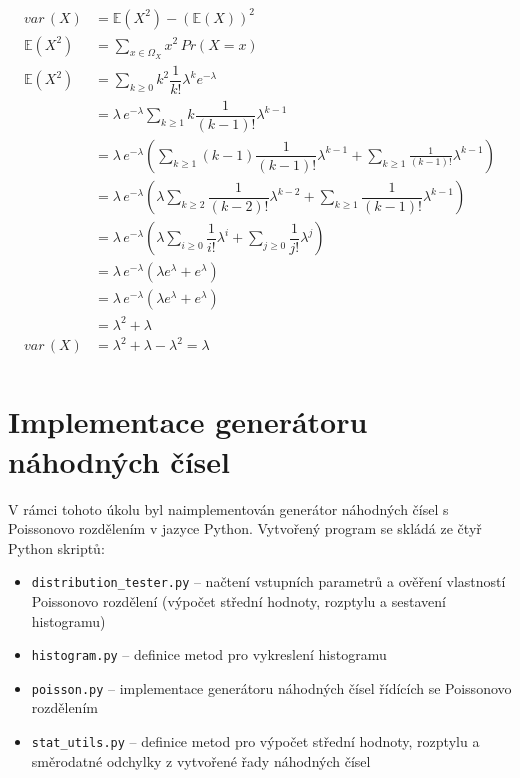 \documentclass[12pt, a4paper]{article}
\let\oldsection\section
\renewcommand\section{\clearpage\oldsection}
\begin{document}
    \begin{equation}
        \label{variance}
        \begin{split}
            var\,(X) & = \mathbb{E} (X^2) - (\mathbb{E} (X))^2 \\
            \mathbb{E} (X^2) &= \sum_{x \mathop \in \Omega_{X}} x^2 \, Pr(X = x) \\
            \mathbb{E} (X^2) &= \sum_{k \mathop \ge 0} {k^2 \dfrac 1 {k!} \lambda^k e^{-\lambda} } \\
            & = \lambda\, e^{-\lambda} \sum_{k \mathop \ge 1} {k \dfrac 1 {(k - 1)!} \lambda^{k - 1} } \\
            & = \lambda\, e^{-\lambda} ( \sum_{k \mathop \ge 1} {(k - 1) \dfrac 1 {(k - 1)!} \lambda^{k - 1} } + \sum_{k \mathop \ge 1} {\frac 1 {(k - 1)!} \lambda^{k - 1} }  ) \\
            & = \lambda\, e^{-\lambda} ( \lambda \sum_{k \mathop \ge 2} {\dfrac 1 {(k - 2)!} \lambda^{k - 2} } + \sum_{k \mathop \ge 1} {\dfrac 1 {(k - 1)!} \lambda^{k - 1} } ) \\
            & = \lambda\, e^{-\lambda} ( \lambda \sum_{i \mathop \ge 0} {\dfrac 1 {i!} \lambda^i} + \sum_{j \mathop \ge 0} {\dfrac 1 {j!} \lambda^j} ) \\
            & = \lambda\, e^{-\lambda} ( \lambda e^\lambda + e^\lambda) \\
            & = \lambda\, e^{-\lambda} ( \lambda e^\lambda + e^\lambda) \\
            & = \lambda^2 + \lambda \\
            var\,(X) & = \lambda^{2} + \lambda - \lambda^{2} = \lambda \\
        \end{split}
    \end{equation}


    \section{Implementace generátoru náhodných čísel}

    V rámci tohoto úkolu byl naimplementován generátor náhodných čísel s Poissonovo rozdělením v jazyce Python.
    Vytvořený program se skládá ze čtyř Python skriptů:
    \begin{itemize}
        \item \texttt{distribution\_tester.py} -- načtení vstupních parametrů a ověření vlastností Poissonovo rozdělení (výpočet střední hodnoty, rozptylu a sestavení histogramu)
        \item \texttt{histogram.py} -- definice metod pro vykreslení histogramu
        \item \texttt{poisson.py} -- implementace generátoru náhodných čísel řídících se Poissonovo rozdělením
        \item \texttt{stat_utils.py} -- definice metod pro výpočet střední hodnoty, rozptylu a směrodatné odchylky z vytvořené řady náhodných čísel
    \end{itemize}
\end{document}
